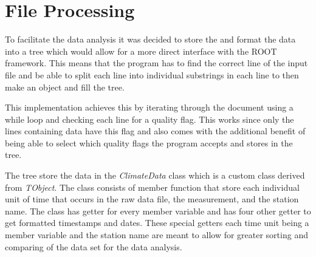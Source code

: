 \documentclass[../main.tex]{subfiles}
\begin{document}
\section{File Processing}

To facilitate the data analysis it was decided to store the and format the data into a tree which would allow for a more direct interface with the ROOT framework. This means that the program has to find the correct line of the input file and be able to split each line into individual substrings in each line to then make an object and fill the tree. 

This implementation achieves this by iterating through the document using a while loop and checking each line for a quality flag. This works since only the lines containing data have this flag and also comes with the additional benefit of being able to select which quality flags the program accepts and stores in the tree.

The tree store the data in the \textit{ClimateData} class which is a custom class derived from \textit{TObject}. The class consists of member function that store each individual unit of time that occurs in the raw data file, the measurement, and the station name. The class has getter for every member variable and has four other getter to get formatted timestamps and dates. These special getters each time unit being a member variable and the station name are meant to allow for greater sorting and comparing of the data set for the data analysis. 
\end{document}
